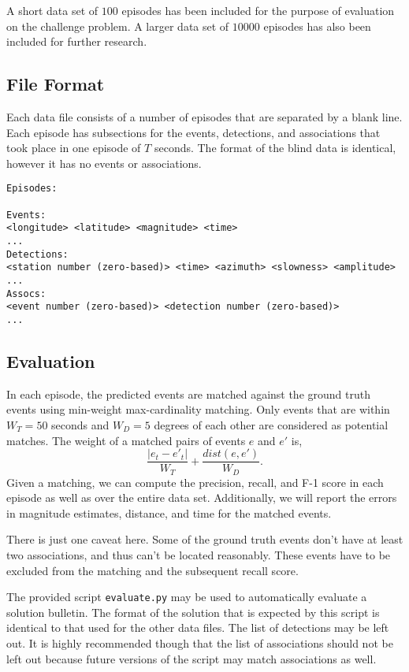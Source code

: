 \documentclass[12pt,letterpaper,onecolumn,oneside]{article}
\begin{document}
A short data set of $100$ episodes has been included for the purpose of
evaluation on the challenge problem. A larger data set of $10000$
episodes has also been included for further research.

\subsection{File Format}

Each data file consists of a number of episodes that are separated by a
blank line. Each episode has subsections for the events, detections, and
associations that took place in one episode of $T$ seconds.
The format of the blind data is identical, however it has no events
or associations.

\begin{verbatim}
Episodes:

Events:
<longitude> <latitude> <magnitude> <time>
...
Detections:
<station number (zero-based)> <time> <azimuth> <slowness> <amplitude>
...
Assocs:
<event number (zero-based)> <detection number (zero-based)>
...

\end{verbatim}

\subsection{Evaluation}

In each episode, the predicted events are matched against the ground
truth events using min-weight max-cardinality matching. Only events that
are within $W_T=50$ seconds and $W_D=5$ degrees of each other are
considered as potential matches. The weight of a matched pairs of events
$e$ and $e'$ is,
\[\frac{|e_t - e'_t|}{W_T}  + \frac{dist(e,e')}{W_D} . \]
Given a matching, we can compute the precision, recall, and F-1 score in
each episode as well as over the entire data set. Additionally, we will
report the errors in magnitude estimates, distance, and time for the
matched events.

There is just one caveat here. Some of the ground truth events don't
have at least two associations, and thus can't be located
reasonably. These events have to be excluded from the matching and the
subsequent recall score.

The provided script {\tt evaluate.py} may be used to automatically
evaluate a solution bulletin. The format of the solution that is
expected by this script is identical to that used for the other data
files. The list of detections may be left out. It is highly recommended
though that the list of associations should not be left out because
future versions of the script may match associations as well.
\end{document}
